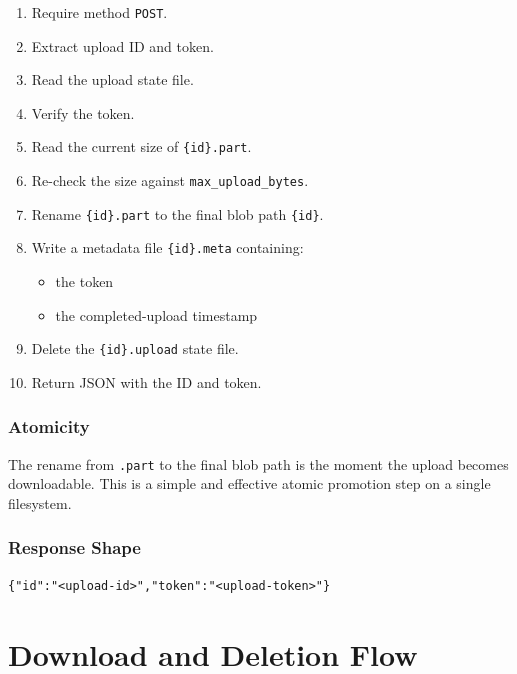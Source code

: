 \documentclass[11pt,a4paper]{report}
\begin{document}
\begin{enumerate}
    \item Require method \texttt{POST}.
    \item Extract upload ID and token.
    \item Read the upload state file.
    \item Verify the token.
    \item Read the current size of \texttt{\{id\}.part}.
    \item Re-check the size against \texttt{max\_upload\_bytes}.
    \item Rename \texttt{\{id\}.part} to the final blob path \texttt{\{id\}}.
    \item Write a metadata file \texttt{\{id\}.meta} containing:
    \begin{itemize}
        \item the token
        \item the completed-upload timestamp
    \end{itemize}
    \item Delete the \texttt{\{id\}.upload} state file.
    \item Return JSON with the ID and token.
\end{enumerate}

\subsection{Atomicity}

The rename from \texttt{.part} to the final blob path is the moment the upload becomes downloadable. This is a simple and effective atomic promotion step on a single filesystem.

\subsection{Response Shape}

\begin{lstlisting}[language={}]
{"id":"<upload-id>","token":"<upload-token>"}
\end{lstlisting}

\chapter{Download and Deletion Flow}
\end{document}
